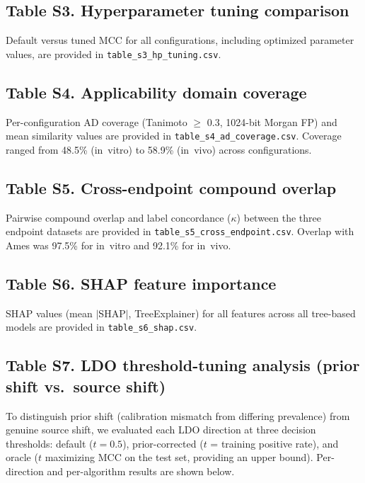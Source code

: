 \subsection*{Table S3. Hyperparameter tuning comparison}

Default versus tuned MCC for all configurations, including optimized parameter values, are 
provided in \texttt{table\_s3\_hp\_tuning.csv}.

\subsection*{Table S4. Applicability domain coverage}

Per-configuration AD coverage (Tanimoto $\geq$ 0.3, 1024-bit Morgan FP) and mean similarity 
values are provided in \texttt{table\_s4\_ad\_coverage.csv}. Coverage ranged from 48.5\% 
(in~vitro) to 58.9\% (in~vivo) across configurations.

\subsection*{Table S5. Cross-endpoint compound overlap}

Pairwise compound overlap and label concordance ($\kappa$) between the three endpoint 
datasets are provided in \texttt{table\_s5\_cross\_endpoint.csv}. Overlap with Ames was 
97.5\% for in~vitro and 92.1\% for in~vivo.

\subsection*{Table S6. SHAP feature importance}

SHAP values (mean $|$SHAP$|$, TreeExplainer) for all features across all tree-based models 
are provided in \texttt{table\_s6\_shap.csv}.

\subsection*{Table S7. LDO threshold-tuning analysis (prior shift vs.\ source shift)}

To distinguish prior shift (calibration mismatch from differing prevalence) from genuine 
source shift, we evaluated each LDO direction at three decision thresholds: default 
($t = 0.5$), prior-corrected ($t$ = training positive rate), and oracle ($t$ maximizing MCC 
on the test set, providing an upper bound). Per-direction and per-algorithm results are 
shown below.

